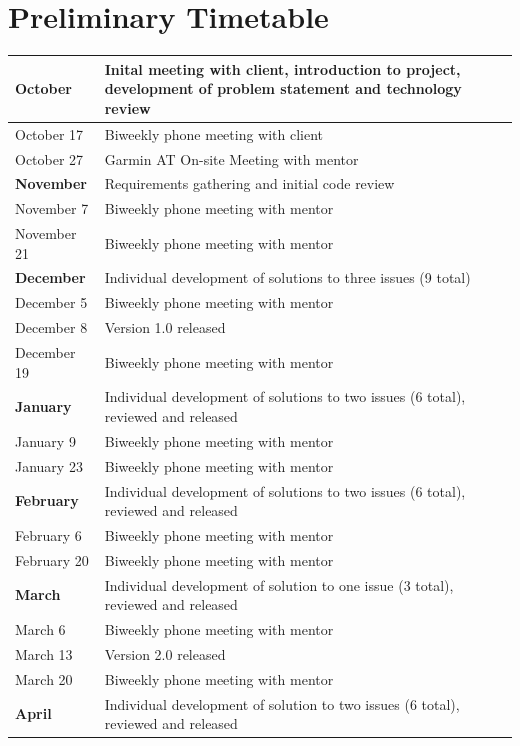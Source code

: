 \documentclass[11pt]{scrreprt}
\begin{document}
\section{Preliminary Timetable}
\noindent\begin{longtable}{| p{} | p{} |}
\hline
\textbf{October} & Inital meeting with client, introduction to project, development of problem statement and technology review\\
\hline
October 17 & Biweekly phone meeting with client\\
\hline
October 27 & Garmin AT On-site Meeting with mentor\\ 
\hline
\textbf{November} & Requirements gathering and initial code review\\
\hline
November 7 & Biweekly phone meeting with mentor\\
\hline
November 21 & Biweekly phone meeting with mentor\\
\hline
\textbf{December} & Individual development of solutions to three issues (9 total)\\
\hline
December 5 & Biweekly phone meeting with mentor\\
\hline
December 8 & Version 1.0 released\\
\hline
December 19 & Biweekly phone meeting with mentor\\
\hline
\textbf{January} & Individual development of solutions to two issues (6 total), reviewed and released\\
\hline
January 9 & Biweekly phone meeting with mentor\\
\hline
January 23 & Biweekly phone meeting with mentor\\
\hline
\textbf{February} & Individual development of solutions to two issues (6 total), reviewed and released\\
\hline
February 6 & Biweekly phone meeting with mentor\\
\hline
February 20 & Biweekly phone meeting with mentor\\
\hline
\textbf{March} & Individual development of solution to one issue (3 total), reviewed and released\\
\hline
March 6 & Biweekly phone meeting with mentor\\
\hline
March 13 & Version 2.0 released\\
\hline
March 20 & Biweekly phone meeting with mentor\\
\hline
\textbf{April} & Individual development of solution to two issues (6 total), reviewed and released\\

\end{longtable}
\end{document}
